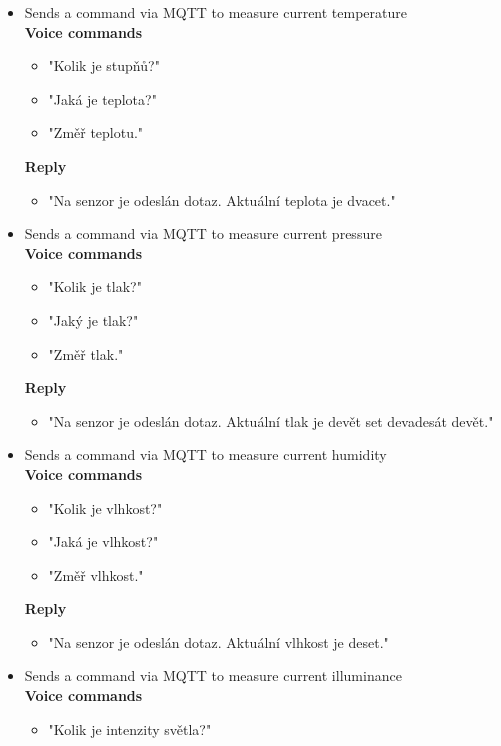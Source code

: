 \begin{itemize}
    \item Sends a command via MQTT to measure current temperature\\
    \textbf{Voice commands}
    \begin{itemize}
        \item "Kolik je stupňů?"
        \item "Jaká je teplota?"
        \item "Změř teplotu."
    \end{itemize}
    \textbf{Reply}
    \begin{itemize}
        \item "Na senzor je odeslán dotaz. Aktuální teplota je dvacet."
    \end{itemize}
    \item Sends a command via MQTT to measure current pressure\\
    \textbf{Voice commands}
    \begin{itemize}
        \item "Kolik je tlak?"
        \item "Jaký je tlak?"
        \item "Změř tlak."
    \end{itemize}
    \textbf{Reply}
    \begin{itemize}
        \item "Na senzor je odeslán dotaz. Aktuální tlak je devět set devadesát devět."
    \end{itemize}
    \item Sends a command via MQTT to measure current humidity\\
    \textbf{Voice commands}
    \begin{itemize}
        \item "Kolik je vlhkost?"
        \item "Jaká je vlhkost?"
        \item "Změř vlhkost."
    \end{itemize}
    \textbf{Reply}
    \begin{itemize}
        \item "Na senzor je odeslán dotaz. Aktuální vlhkost je deset."
    \end{itemize}
    \item Sends a command via MQTT to measure current illuminance\\
    \textbf{Voice commands}
    \begin{itemize}
        \item "Kolik je intenzity světla?"

\end{itemize}
\end{itemize}
